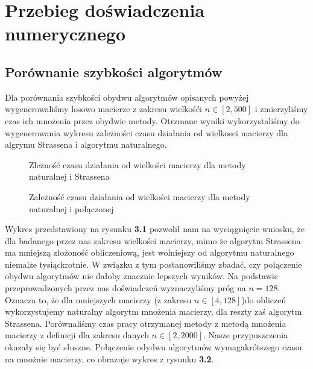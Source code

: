 \section{Przebieg doświadczenia numerycznego}
\subsection{Porównanie szybkości algorytmów}
Dla porównania szybkości obydwu algorytmów opisanych powyżej wygenerowaliśmy
losowo macierze z zakresu wielkośći $n \in [2, 500]$ i zmierzyliśmy czas ich
mnożenia przez obydwie metody. Otrzmane wyniki wykorzystaliśmy do wygenerowania wykresu zależności
czasu działania od wielkosci macierzy dla algrymu Strassena i algorytmu
naturalnego.
\begin{figure}[hb]
\begin{center}

\caption{Zleżność czasu działania od wielkości macierzy dla metody naturalnej i Strassena}
\end{center}
\end{figure}
\begin{figure}[hb]
\begin{center}

\caption{Zależność czasu działania od wielkości macierzy dla metody naturalnej i połączonej}
\end{center}
\end{figure}
Wykres przedstawiony na rysunku \textbf{3.1} pozwolił nam na wyciągnięcie wniosku, że dla badanego przez nas
zakresu wielkości macierzy, mimo że algorytm Strassena ma mniejszą złożoność
obliczeniową, jest wolniejszy od algorytmu naturalnego niemalże tysiąckrotnie. W związku z tym
postanowiliśmy zbadać, czy połączenie obydwu algorytmów nie dałoby znacznie
lepszych wyników. Na podstawie przeprowadzonych przez nas doświadczeń wyznaczyliśmy
próg na $n=128$. Oznacza to, że dla mniejszych macierzy (z zakresu
$n \in [4, 128]$)do obliczeń wykorzystujemy naturalny algorytm mnożenia macierzy,
dla reszty zaś algorytm Strassena. Porównaliśmy czas pracy otrzymanej metody z metodą
mnożenia macierzy z definicji dla zakresu danych $n \in [2, 2000]$. Nasze przypuszczenia okazały się być słuszne.
Połączenie odydwu algorytmów wymagakrótszego czasu na mnożnie macierzy, co obrazuje wykres z rysunku \textbf{3.2}.
